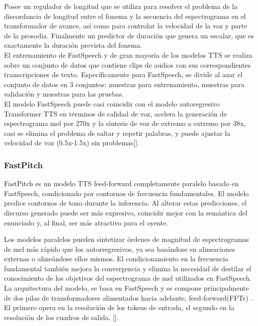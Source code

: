 Posee un regulador de longitud que se utiliza para resolver el problema de la discordancia de longitud entre el fonema y la secuencia del espectrograma en el transformador de avance, así como para controlar la velocidad de la voz y parte de la prosodia. Finalmente un predictor de duración que genera un escalar, que es exactamente la duración prevista del fonema.\\


El entrenamiento de FastSpeech y de  gran mayoría de los modelos TTS se realiza sobre un conjunto de datos que contiene clips de audios con sus correspondientes transcripciones de texto. Específicamente para FastSpeech, se divide al azar el conjunto de datos en 3 conjuntos: muestras para entrenamiento, muestras para validación y muestras para las pruebas. \\


El modelo FastSpeech puede casi coincidir con el modelo autoregresivo Transformer TTS en términos de calidad de voz, acelera la generación de espectrograma mel por 270x y la síntesis de voz de extremo a extremo por 38x, casi se elimina el problema de saltar y repetir palabras, y puede ajustar la velocidad de voz (0.5x-1.5x) sin problemas[\cite{ren2019fastspeech}].


\subsubsection{FastPitch}
FastPitch es un modelo TTS feed-forward completamente paralelo basado en FastSpeech, condicionado por contornos de frecuencia fundamentales. El modelo predice contornos de tono durante la inferencia. Al alterar estas predicciones, el discurso generado puede ser más expresivo, coincidir mejor con la semántica del enunciado y, al final, ser más atractivo para el oyente.

Los modelos paralelos pueden sintetizar órdenes de magnitud de espectrogramas de mel más rápido que los autorregresivos, ya sea basándose en alineaciones externas o alineándose ellos mismos. El condicionamiento en la frecuencia fundamental también mejora la convergencia y elimina la necesidad de destilar el conocimiento de los objetivos del espectrograma de mel utilizados en FastSpeech.\\


La arquitectura del modelo, se basa en FastSpeech y se compone principalmente de dos pilas de transformadores alimentados hacia adelante, feed-forward(FFTr) . El primero opera en la resolución de los tokens de entrada, el segundo en la resolución de los cuadros de salida.
[\cite{lancucki2021fastpitch}].\\

